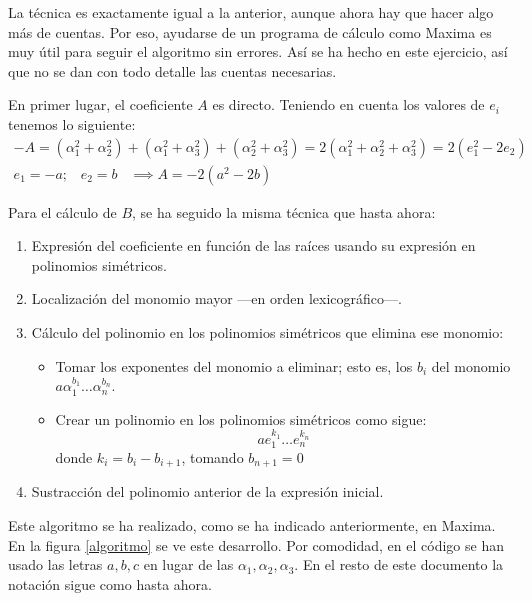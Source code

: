 \documentclass[a4paper, 11pt]{article}
\begin{document}
\begin{solucion}
\begin{apartado}
           La técnica es exactamente igual a la anterior, aunque ahora hay que hacer algo más de cuentas. Por eso, ayudarse de un programa de cálculo como Maxima es muy útil para seguir el algoritmo sin errores. Así se ha hecho en este ejercicio, así que no se dan con todo detalle las cuentas necesarias.

           En primer lugar, el coeficiente $A$ es directo. Teniendo en cuenta los valores de $e_i$ tenemos lo siguiente:
           \begin{align*}
               -A = (\alpha_1^2+\alpha_2^2) + (\alpha_1^2+\alpha_3^2) + (\alpha_2^2+\alpha_3^2) = 2(\alpha_1^2+\alpha_2^2+\alpha_3^2) = 2(e_1^2-2e_2)\\
               e_1 = -a; \;\;\; e_2 = b \;\;\; \implies \boxed{A = -2(a^2-2b)}
           \end{align*}

           Para el cálculo de $B$, se ha seguido la misma técnica que hasta ahora:
           \begin{enumerate}
               \item Expresión del coeficiente en función de las raíces usando su expresión en polinomios simétricos.
               \item Localización del monomio mayor ---en orden lexicográfico---.
               \item Cálculo del polinomio en los polinomios simétricos que elimina ese monomio:
               \begin{itemize}
                   \item Tomar los exponentes del monomio a eliminar; esto es, los $b_i$ del monomio $a\alpha_1^{b_1}\dots\alpha_n^{b_n}$.
                   \item Crear un polinomio en los polinomios simétricos como sigue:
                   \[ ae_1^{k_1} \dots e_n^{k_n} \]
                   donde $k_i = b_i - b_{i+1}$, tomando $b_{n+1} = 0$
               \end{itemize}
               \item Sustracción del polinomio anterior de la expresión inicial.
           \end{enumerate}

           Este algoritmo se ha realizado, como se ha indicado anteriormente, en Maxima. En la figura \ref{algoritmo} se ve este desarrollo. Por comodidad, en el código se han usado las letras $a,b,c$ en lugar de las $\alpha_1, \alpha_2, \alpha_3$. En el resto de este documento la notación sigue como hasta ahora.


\end{apartado}
\end{solucion}
\end{document}
